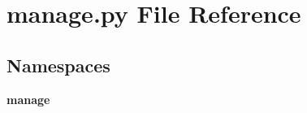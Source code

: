\section{manage.\+py File Reference}
\label{manage_8py}
\subsection*{Namespaces}
\begin{DoxyCompactItemize}
\item 
 {\bf manage}
\end{DoxyCompactItemize}
